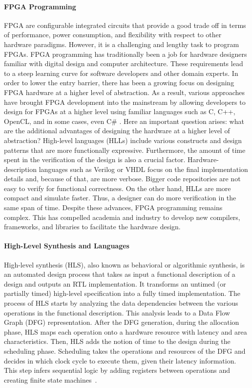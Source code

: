 \paragraph*{FPGA Programming}
FPGA are configurable integrated circuits that provide a good trade off in
terms of performance, power consumption, and flexibility with
respect to other hardware paradigms. However, it is a challenging and lengthy task to program FPGAs. FPGA programming has traditionally been a job for hardware designers familiar with digital design and computer architecture. These requirements lead to a steep learning curve for software developers and other domain experts. In order to lower the entry barrier, there has been a growing focus on designing FPGA hardware at a higher level of abstraction. As a result, various approaches have brought FPGA development into the mainstream by allowing developers to design for FPGAs at a higher level using familiar languages such as C, C++, OpenCL, and in some cases, even C\# \cite{kiwiHLS}. Here an important question arises: what are the additional advantages of designing the hardware at a higher level of abstraction? High-level languages (HLLs) include various constructs and design patterns that are more functionally expressive. Furthermore, the amount of time spent in the verification of the design is also a crucial factor. Hardware-description languages such as Verilog or VHDL focus on the final implementation details and, because of that, are more verbose. Bigger code repositories are not easy to verify for functional correctness. On the other hand, HLLs are more compact and simulate faster. Thus, a designer can do more verification in the same span of time. Despite these advances, FPGA programming remains complex. This has compelled academia and industry to develop new compilers, frameworks, and libraries to facilitate the hardware design.

\paragraph*{High-Level Synthesis and Languages}

High-level synthesis (HLS), also known as behavioral or algorithmic synthesis, is an automated design process that takes as input a functional description of a design and outputs an RTL implementation. It transforms an untimed (or partially timed) high-level specification into a fully timed implementation. The process of HLS starts by analyzing the data dependencies between the various operations in the functional description. This analysis leads to a Data Flow Graph (DFG) representation. After the DFG generation, during the allocation phase, HLS maps each operation onto a hardware resource with latency and area characteristics. Then, HLS adds the notion of time to the design during the scheduling phase. Scheduling takes the operations and resources of the DFG and decides in which clock cycle to execute them, given their latency information. This step infers sequential logic by adding registers between operations and creating finite state machines~\cite{hlsbluebook}. 

